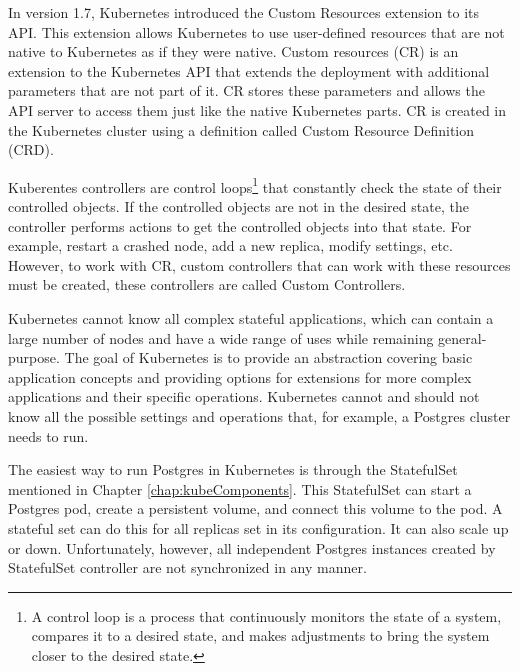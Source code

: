 In version 1.7, Kubernetes introduced the Custom Resources extension to its API. \cite{githubIBMCr} This extension allows Kubernetes to use user-defined resources that are not native to Kubernetes as if they were native. \cite{NewStackCRDs} Custom resources (CR) is an extension to the Kubernetes API that extends the deployment with additional parameters that are not part of it. CR stores these parameters and allows the API server to access them just like the native Kubernetes parts. CR is created in the Kubernetes cluster using a definition called Custom Resource Definition (CRD). \cite{operatorsAtK8sIface}

Kuberentes controllers are control loops\footnote[1]{A control loop is a process that continuously monitors the state of a system, compares it to a desired state, and makes adjustments to bring the system closer to the desired state.} that constantly check the state of their controlled objects. If the controlled objects are not in the desired state, the controller performs actions to get the controlled objects into that state. For example, restart a crashed node, add a new replica, modify settings, etc. \cite{docuKubeControllers}
However, to work with CR, custom controllers that can work with these resources must be created, these controllers are called Custom Controllers. \cite{docuKubeCR}



\label{chap:postgresInKube}
Kubernetes cannot know all complex stateful applications, which can contain a large number of nodes and have a wide range of uses while remaining general-purpose.
The goal of Kubernetes is to provide an abstraction covering basic application concepts and providing options for extensions for more complex applications and their specific operations.
Kubernetes cannot and should not know all the possible settings and operations that, for example, a Postgres cluster needs to run. \cite{operatorsTeaches}

The easiest way to run Postgres in Kubernetes is through the StatefulSet mentioned in Chapter \ref{chap:kubeComponents}. This StatefulSet can start a Postgres pod, create a persistent volume, and connect this volume to the pod. A stateful set can do this for all replicas set in its configuration. It can also scale up or down. Unfortunately, however, all independent Postgres instances created by StatefulSet controller are not synchronized in any manner.

